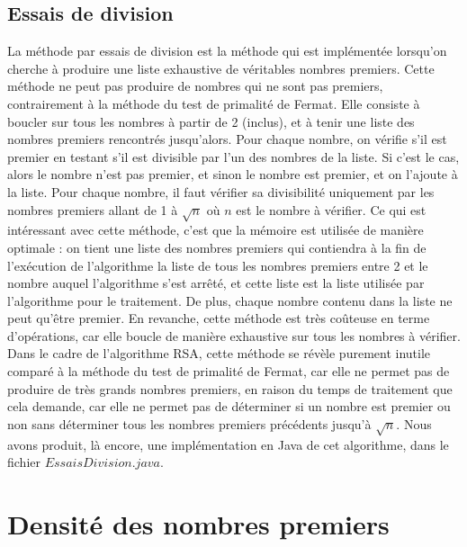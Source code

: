 		\subsection{Essais de division}
			La méthode par essais de division est la méthode qui est implémentée lorsqu'on cherche à produire une liste exhaustive de véritables nombres premiers. Cette méthode ne peut pas produire de nombres qui ne sont pas premiers, contrairement à la méthode du test de primalité de Fermat. Elle consiste à boucler sur tous les nombres à partir de 2 (inclus), et à tenir une liste des nombres premiers rencontrés jusqu'alors. Pour chaque nombre, on vérifie s'il est premier en testant s'il est divisible par l'un des nombres de la liste. Si c'est le cas, alors le nombre n'est pas premier, et sinon le nombre est premier, et on l'ajoute à la liste. Pour chaque nombre, il faut vérifier sa divisibilité uniquement par les nombres premiers allant de 1 à $\sqrt{n}$ où $n$ est le nombre à vérifier. Ce qui est intéressant avec cette méthode, c'est que la mémoire est utilisée de manière optimale : on tient une liste des nombres premiers qui contiendra à la fin de l'exécution de l'algorithme la liste de tous les nombres premiers entre 2 et le nombre auquel l'algorithme s'est arrêté, et cette liste est la liste utilisée par l'algorithme pour le traitement. De plus, chaque nombre contenu dans la liste ne peut qu'être premier. En revanche, cette méthode est très coûteuse en terme d'opérations, car elle boucle de manière exhaustive sur tous les nombres à vérifier. Dans le cadre de l'algorithme RSA, cette méthode se révèle purement inutile comparé à la méthode du test de primalité de Fermat, car elle ne permet pas de produire de très grands nombres premiers, en raison du temps de traitement que cela demande, car elle ne permet pas de déterminer si un nombre est premier ou non sans déterminer tous les nombres premiers précédents jusqu'à $\sqrt{n}$. Nous avons produit, là encore, une implémentation en Java de cet algorithme, dans le fichier $EssaisDivision.java$.
	\section{Densité des nombres premiers}